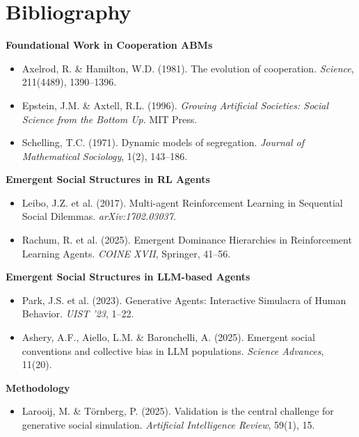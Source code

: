 \section{Bibliography}

\textbf{Foundational Work in Cooperation ABMs}
\begin{itemize}
    \item Axelrod, R. \& Hamilton, W.D. (1981). The evolution of cooperation. \textit{Science}, 211(4489), 1390--1396.
    \item Epstein, J.M. \& Axtell, R.L. (1996). \textit{Growing Artificial Societies: Social Science from the Bottom Up}. MIT Press.
    \item Schelling, T.C. (1971). Dynamic models of segregation. \textit{Journal of Mathematical Sociology}, 1(2), 143--186.
\end{itemize}

\textbf{Emergent Social Structures in RL Agents}
\begin{itemize}
    \item Leibo, J.Z. et al. (2017). Multi-agent Reinforcement Learning in Sequential Social Dilemmas. \textit{arXiv:1702.03037}.
    \item Rachum, R. et al. (2025). Emergent Dominance Hierarchies in Reinforcement Learning Agents. \textit{COINE XVII}, Springer, 41--56.
\end{itemize}

\textbf{Emergent Social Structures in LLM-based Agents}
\begin{itemize}
    \item Park, J.S. et al. (2023). Generative Agents: Interactive Simulacra of Human Behavior. \textit{UIST '23}, 1--22.
    \item Ashery, A.F., Aiello, L.M. \& Baronchelli, A. (2025). Emergent social conventions and collective bias in LLM populations. \textit{Science Advances}, 11(20).
\end{itemize}

\textbf{Methodology}
\begin{itemize}
    \item Larooij, M. \& Törnberg, P. (2025). Validation is the central challenge for generative social simulation. \textit{Artificial Intelligence Review}, 59(1), 15.
\end{itemize}
